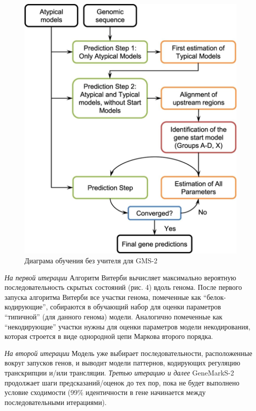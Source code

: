 \documentclass[14pt]{extarticle}
\begin{document}
    \begin{figure}[]
            \centering
            \includegraphics[width=\textwidth]{img/gms2_2.jpg}
            \caption{Диаграма обучения без учителя для GMS-2 \cite{lomsad}}
            \label{fig:skybox}
    \end{figure}
    
    
    \par{\textit{На первой итерации} Алгоритм Витерби вычисляет максимально вероятную 
    последовательность скрытых состояний (рис. 4) вдоль генома. После первого запуска
    алгоритма Витерби все участки генома, помеченные как ``белок-кодирующие'', собираются в обучающий набор для оценки 
    параметров ``типичной'' (для данного генома) модели. Аналогично помеченные как ``некодирующие'' участки нужны для 
    оценки параметров модели некодирования, которая строется в виде однородной цепи Маркова второго порядка.}
    
    
    \par{\textit{На второй итерации} Модель уже выбирает последовательности, расположенные вокруг запусков генов, 
    и выводит модели паттернов, кодирующих регуляцию транскрипции и/или трансляции. \textit{Третью итерацию и 
    далее} GeneMarkS-2 продолжает шаги предсказаний/оценок до тех пор, пока не 
    будет выполнено условие сходимости (99\% идентичности в гене начинается между последовательными итерациями).}
    
\end{document}
